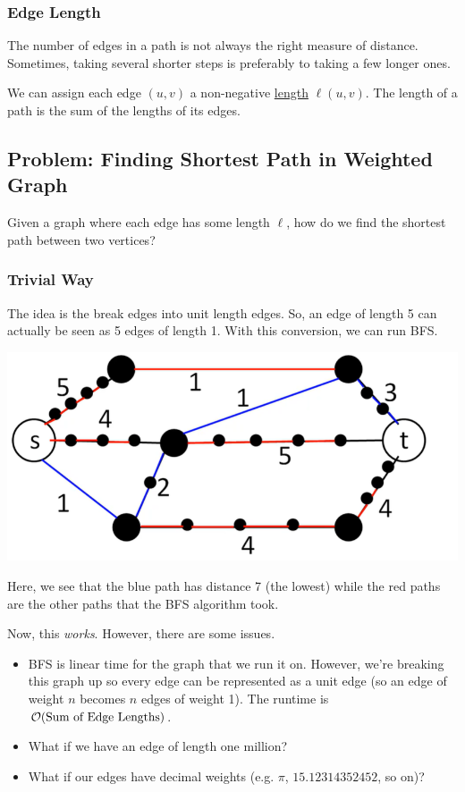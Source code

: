 \documentclass[letterpaper]{article}
\begin{document}
\subsubsection{Edge Length}
The number of edges in a path is not always the right measure of distance. Sometimes, taking several shorter steps is preferably to taking a few longer ones. 

\bigskip 

We can assign each edge $(u, v)$ a non-negative \underline{length} $\ell(u, v)$. The length of a path is the sum of the lengths of its edges.






\subsection{Problem: Finding Shortest Path in Weighted Graph}
Given a graph where each edge has some length $\ell$, how do we find the shortest path between two vertices? 


\subsubsection{Trivial Way}
The idea is the break edges into unit length edges. So, an edge of length 5 can actually be seen as 5 edges of length 1. With this conversion, we can run BFS. 
\begin{center}
    \includegraphics[scale=0.4]{assets/bfs_unit_edges.png}
\end{center}
Here, we see that the blue path has distance 7 (the lowest) while the red paths are the other paths that the BFS algorithm took. 

\bigskip 

Now, this \emph{works}. However, there are some issues. 
\begin{itemize}
    \item BFS is linear time for the graph that we run it on. However, we're breaking this graph up so every edge can be represented as a unit edge (so an edge of weight $n$ becomes $n$ edges of weight 1). The runtime is $\mathcal{O}(\text{Sum of Edge Lengths})$.
    \item What if we have an edge of length one million? 
    \item What if our edges have decimal weights (e.g. $\pi$, $15.12314352452$, so on)?
\end{itemize}
\end{document}
